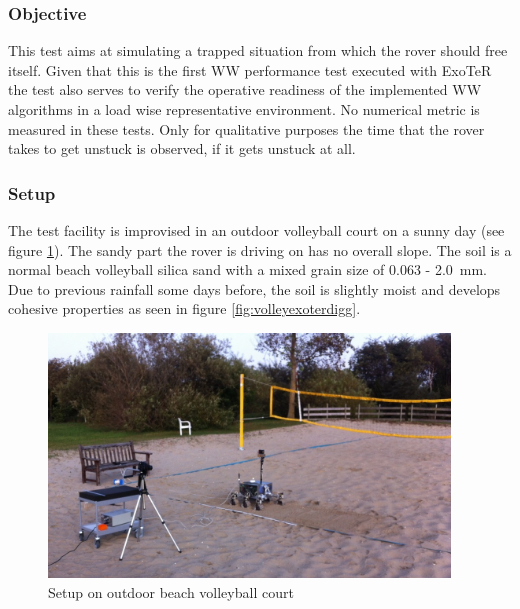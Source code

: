 \documentclass[a4paper,twocolumn]{esapub2005} %
\begin{document}
\subsubsection{Objective} This test aims at simulating a trapped situation from
which the rover should free itself. Given that this is the first WW performance test
executed with ExoTeR the test also serves to verify the operative
readiness of the implemented WW algorithms in a load wise representative
environment.  No numerical metric is measured in these tests. Only for
qualitative purposes the time that the rover takes to get unstuck is
observed, if it gets unstuck at all.

\subsubsection{Setup} The test facility is improvised in an outdoor volleyball
court on a sunny day (see figure \ref{fig:volley}). The sandy part the rover
is driving on has no overall slope. The soil is a normal beach volleyball
silica sand with a mixed grain size of 0.063 - 2.0~\unit{mm}. Due to previous rainfall
some days before, the soil is slightly moist and develops cohesive properties
as seen in figure \ref{fig:volleyexoterdigg}. 

\begin{figure}[h!]
    \centering
    \includegraphics[width=0.95\textwidth]{volley.jpg}
    \caption{Setup on outdoor beach volleyball court}
    \label{fig:volley}
\end{figure}

\end{document}
